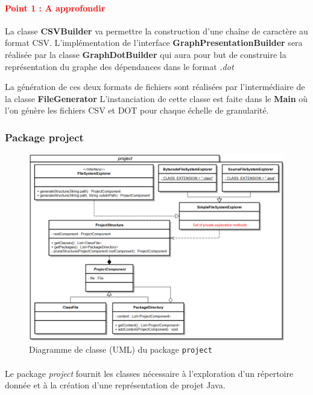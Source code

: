 \documentclass{scrartcl}
\newcommand{\TODO}[1] {
    \noindent \paragraph{\textcolor{red}{#1}}
}
\begin{document}
     \TODO{Point 1 : A approfondir}
    
    La classe \textbf{CSVBuilder} va permettre la construction d'une chaîne de caractère au format CSV.
    L'implémentation de l'interface \textbf{GraphPresentationBuilder} sera réalisée par la classe \textbf{GraphDotBuilder} qui aura pour but de construire la représentation du graphe des dépendances dans le format \emph{.dot}
    
   La génération de ces deux formats de fichiers sont réalisées par l'intermédiaire de la classe \textbf{FileGenerator} 
   L'instanciation de cette classe est faite dans le \textbf{Main} où l'on génère les fichiers CSV et DOT pour chaque échelle de granularité.

    
\subsubsection{Package project}
    \begin{figure}[h!]
        \centering
        \includegraphics[width=\textwidth]{img/uml/project.png}
        \caption{Diagramme de classe (UML) du package \texttt{project}}
    \end{figure}
	\paragraph{}Le package \emph{project} fournit les classes nécessaire à l'exploration d'un répertoire donnée et à la création d'une représentation de projet Java.
\end{document}
